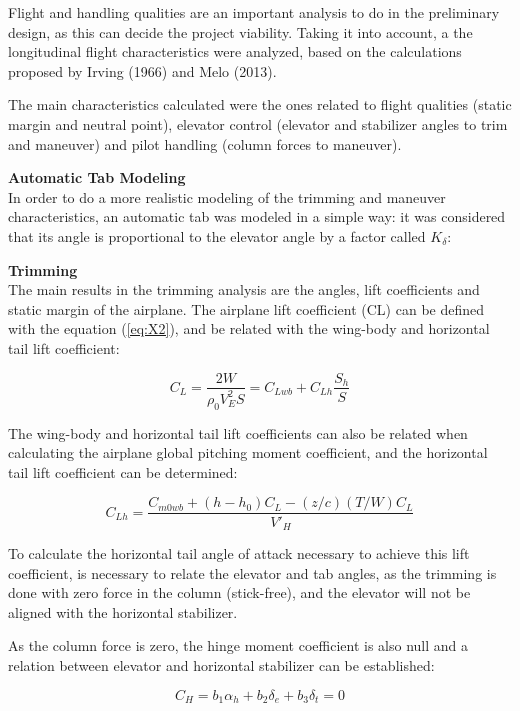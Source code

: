 Flight and handling qualities are an important analysis to do in the preliminary design, as this can decide the project viability. Taking it into account, a the longitudinal flight characteristics were analyzed, based on the calculations proposed by Irving (1966) and Melo (2013).

The main characteristics calculated were the ones related to flight qualities (static margin and neutral point), elevator control (elevator and stabilizer angles to trim and maneuver) and pilot handling (column forces to maneuver).

\textbf{Automatic Tab Modeling}
\\
In order to do a more realistic modeling of the trimming and maneuver characteristics, an automatic tab was modeled in a simple way: it was considered that its angle is proportional to the elevator angle by a factor called $K_{\delta}$:

\textbf{Trimming}
\\
The main results in the trimming analysis are the angles, lift coefficients and static margin of the airplane. The airplane lift coefficient (CL) can be defined with the equation (\ref{eq:X2}), and be related with the wing-body and horizontal tail lift coefficient:

\begin{equation}
    C_{L}=\frac{2W}{\rho_{0}V_{E}^{2}S}=C_{Lwb}+C_{Lh}\frac{S_{h}}{S}
    \label{eq:X2}
\end{equation}

The wing-body and horizontal tail lift coefficients can also be related when calculating the airplane global pitching moment coefficient, and the horizontal tail lift coefficient can be determined:

\begin{equation}
    C_{Lh}=\frac{C_{m0wb}+(h-h_{0})C_{L}-(z/c)(T/W)C_{L}}{V'_{H}}
    \label{eq:X3}
\end{equation}

To calculate the horizontal tail angle of attack necessary to achieve this lift coefficient, is necessary to relate the elevator and tab angles, as the trimming is done with zero force in the column (stick-free), and the elevator will not be aligned with the horizontal stabilizer.

As the column force is zero, the hinge moment coefficient is also null and a relation between elevator and horizontal stabilizer can be established:

\begin{equation}
    C_{H}=b_{1}\alpha_{h}+b_{2}\delta_{e}+b_{3}\delta_{t}=0
    \label{eq:X4}
\end{equation}


